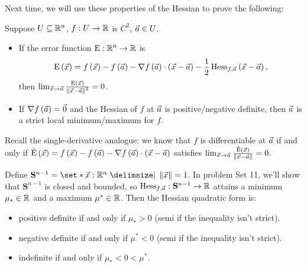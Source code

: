 \documentclass[main.tex]{subfiles}
\begin{document}
Next time, we will use these properties of the Hessian to prove the following:

\begin{theorem}
    Suppose $U\subseteq \mathbb R^n$, $f : U \to \mathbb R$ is $C^2$, $\vec{a} \in U$.
    \begin{itemize}
        \item If the error function $\mathrm{E} : \mathbb R^n \to \mathbb R$ is
        \[\mathrm{E}\left( \vec{x} \right) = f\left( \vec{x} \right) - f\left( \vec{a} \right) - \nabla f\left( \vec{a} \right)\cdot\left( \vec{x} - \vec{a} \right) - \frac{1}{2}\operatorname{Hess}_{f, \vec{a}}\left( \vec{x} - \vec{a} \right),\]
        then $\lim_{\vec{x}\to \vec{a}} \frac{\mathrm{E}\left( \vec{x} \right)}{\left\lVert \vec{x} - \vec{a} \right\rVert^2} = 0$.
        \item If $\nabla f\left( \vec{a} \right) = \vec{0}$ and the Hessian of $f$ at $\vec{a}$ is positive/negative definite, then $\vec{a}$ is a strict local minimum/maximum for $f$.
    \end{itemize}
\end{theorem}

\begin{remark}
    Recall the single-derivative analogue: we know that $f$ is differentiable at $\vec{a}$ if and only if $\tilde{\mathrm{E}}\left( \vec{x} \right) = f\left( \vec{x} \right) - f\left( \vec{a} \right) - \nabla f\left( \vec{a} \right) \cdot \left( \vec{x} - \vec{a} \right)$ satisfies $\lim_{\vec{x}\to \vec{a}} \frac{\tilde{\mathrm{E}}\left( \vec{x} \right)}{\left\lVert \vec{x} - \vec{a} \right\rVert} = 0$.
\end{remark}

\begin{remark}
    Define $\mathbf{S}^{n - 1} = \set*{\vx : \RR^n \mid \norm{\vx} = 1}$. In problem Set 11, we'll show that $\mathbf{S}^{n - 1}$ is closed and bounded, so $\operatorname{Hess}_{f, \vec{a}} : \mathbf{S}^{n - 1} \to \mathbb R$ attains a minimum $\mu_*\in \mathbb R$ and a maximum $\mu^*\in \mathbb R$. Then the Hessian quadratic form is:
    \begin{itemize}
        \item positive definite if and only if $\mu_* > 0$ (semi if the inequality isn't strict).
        \item negative definite if and only if $\mu^* < 0$ (semi if the inequality isn't strict).
        \item indefinite if and only if $\mu_* < 0 < \mu^*$.
    \end{itemize}
\end{remark}
\end{document}
